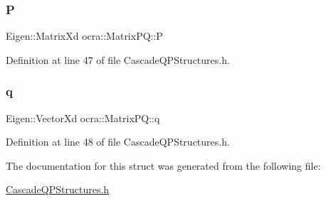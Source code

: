 \subsubsection{\texorpdfstring{P}{P}}
{\footnotesize\ttfamily Eigen\+::\+Matrix\+Xd ocra\+::\+Matrix\+P\+Q\+::P}



Definition at line 47 of file Cascade\+Q\+P\+Structures.\+h.

\hypertarget{structocra_1_1MatrixPQ_a5b735797657100582565c6337fb090e1}{}\label{structocra_1_1MatrixPQ_a5b735797657100582565c6337fb090e1} 
\subsubsection{\texorpdfstring{q}{q}}
{\footnotesize\ttfamily Eigen\+::\+Vector\+Xd ocra\+::\+Matrix\+P\+Q\+::q}



Definition at line 48 of file Cascade\+Q\+P\+Structures.\+h.



The documentation for this struct was generated from the following file\+:\begin{DoxyCompactItemize}
\item 
\hyperlink{CascadeQPStructures_8h}{Cascade\+Q\+P\+Structures.\+h}\end{DoxyCompactItemize}
